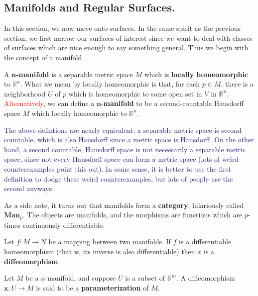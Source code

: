 \documentclass[12pt,letterpaper,boxed]{maths_v5}
\newcommand{\rr}{\mathbb{R}}
\theoremstyle{definition}
\begin{document}
\subsection{Manifolds and Regular Surfaces.}
In this section, we now move onto surfaces. In the same spirit as the previous section, 
we first narrow our surfaces of interest since we want to deal with classes 
of surfaces which are nice enough to say something general. Thus we begin with 
the concept of a manifold. 


\begin{defn}
    A $\bm{n}$\textbf{-manifold} is a separable metric space $M$ 
    which is \textbf{locally homeomorphic} to $\rr^n$. What we mean by 
    locally homeomorphic is that, for each $p \in M$, there is a neighborhood $U$ of $p$ 
    which is homeomorphic to some open set in $V$ in $\rr^n$.
    \\

    \noindent \textcolor{Red}{Alternatively}, we can define a $\bm{n}$-\textbf{manifold} to be a
    second-countable Hausdorff space $M$ which locally homeomorphic to $\rr^n$. 
\end{defn}
\textcolor{MidnightBlue}{The above defintions are nearly equivalent: a separable metric space is second countable, 
which is also 
Hausdorff since a metric space is Hausdorff. On the other hand, a second countable, Hausdorff 
space is not necessarily a separable metric space, since not every Hausdorff 
space can form a metric space (lots of weird counterexamples point this out).
In some sense, it is better to use the first definition to dodge these 
weird counterexamples, but lots of people use the second anyways.}

As a side note, it turns out that manifolds form a \textbf{category}, 
hilariously called $\textbf{Man}_{p}$. 
The objects are manifolds, and the morphisms are functions which are $p$-times 
continuously differentiable.

\begin{defn}
    Let $f: M \to N$ be a mapping between two manifolds. If $f$ is a 
    differentiable homeomorphism (that is, its inverse is also differentiable)
    then $x$ is a \textbf{diffeomorphism}. 
\end{defn}

\begin{defn}
    Let $M$ be a $n$-manifold, and suppose
    $U$ is a subset of $\rr^m$. A diffeomorphism 
    $\bm{x}: U \to M$ is said to be a \textbf{parameterization} of $M$. 
\end{defn}
\end{document}
